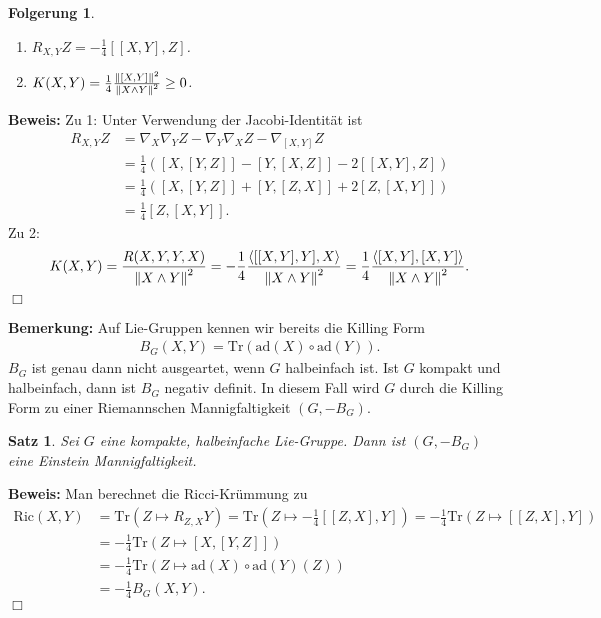 \documentclass[12pt,a4paper]{article}
\def\ad{\mathrm{ad}}
\def\Tr{\mathrm{Tr}}
\def\Ric{\mathrm{Ric}}
\def\ad{\mathrm{ad}}
\newtheorem{Satz}[Lemma]{Satz}
\newtheorem{Folgerung}[Lemma]{Folgerung}
\def\proof{\noindent\textbf{Beweis:}\quad}
\def\qed{\quad\hfill\ensuremath{\Box}}
\begin{document}
\begin{Folgerung}
\begin{enumerate}
  \item $R_{X,Y}Z = -\frac{1}{4}[[X,Y],Z]$.
  \item $K(X,Y) = \frac{1}{4}\frac{\left\|[X,Y]\right\|^2}{\left\|X\wedge Y\right\|^2}\ge 0$.
\end{enumerate}
\end{Folgerung}

\proof
Zu 1: Unter Verwendung der Jacobi-Identit\"at ist
\begin{align*}
R_{X,Y}Z &= \nabla_X\nabla_Y Z - \nabla_Y\nabla_X Z - \nabla_{[X,Y]}Z\\
&= \frac{1}{4}\left( [X,[Y,Z]] - [Y,[X,Z]] - 2[[X,Y],Z]\right)\\
&= \frac{1}{4}\left( [X,[Y,Z]] + [Y,[Z,X]] + 2[Z,[X,Y]]\right)\\
&= \frac{1}{4}[Z,[X,Y]].
\end{align*}
Zu 2:
\begin{align*}
K(X,Y) = \frac{R(X,Y,Y,X)}{\left\|X\wedge Y\right\|^2}
= -\frac{1}{4} \frac{\left\langle[[X,Y],Y],X\right\rangle}{\left\|X\wedge Y\right\|^2}
= \frac{1}{4} \frac{\left\langle[X,Y],[X,Y]\right\rangle}{\left\|X\wedge Y\right\|^2}.
\end{align*}
\qed

{\bf Bemerkung:}
Auf Lie-Gruppen kennen wir bereits die Killing Form
\begin{align*}
B_G(X,Y) = \Tr(\ad(X)\circ\ad(Y)).
\end{align*}
$B_G$ ist genau dann nicht ausgeartet, wenn
$G$ halbeinfach ist.
Ist $G$ kompakt und halbeinfach, dann ist $B_G$ negativ definit. In diesem Fall
wird $G$ durch die Killing Form zu einer Riemannschen Mannigfaltigkeit
$(G,-B_G)$.

\bigskip

\begin{Satz}
Sei $G$ eine kompakte, halbeinfache Lie-Gruppe. Dann ist $(G,-B_G)$ eine
Einstein Mannigfaltigkeit.
\end{Satz}
\proof
Man berechnet die Ricci-Kr\"ummung zu
\begin{align*}
\Ric(X,Y) &= \Tr(Z\mapsto R_{Z,X}Y) = 
\Tr(Z\mapsto -\frac{1}{4}[[Z,X],Y]) = 
-\frac{1}{4}
\Tr(Z\mapsto [[Z,X],Y])\\
&=
-\frac{1}{4}
\Tr(Z\mapsto [X,[Y,Z]])\\
&= 
-\frac{1}{4}
\Tr(Z\mapsto \ad(X)\circ\ad(Y)(Z))\\
&=-\frac{1}{4}B_G(X,Y).
\end{align*}
\qed
\end{document}
